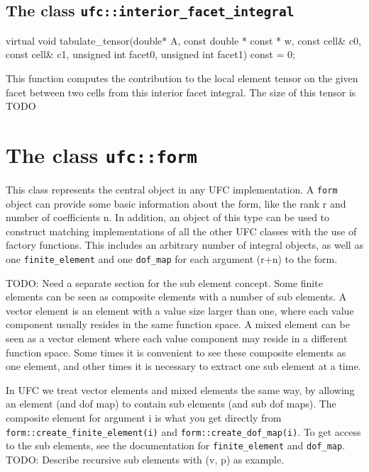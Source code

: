 
\subsection{The class \texttt{ufc::interior\_facet\_integral}}
\begin{code}
virtual void tabulate_tensor(double* A,
                             const double * const * w,
                             const cell& c0,
                             const cell& c1,
                             unsigned int facet0,
                             unsigned int facet1) const = 0;
\end{code}
This function computes the contribution to the local element tensor
on the given facet between two cells from this interior facet integral.
The size of this tensor is TODO


\section{The class \texttt{ufc::form}}

This class represents the central object in any UFC implementation.
A \texttt{form} object can provide some basic information about the form,
like the rank r and number of coefficients n.
In addition, an object of this type can be used to construct matching
implementations of all the other UFC classes with the use of factory functions.
This includes an arbitrary number of integral objects,
as well as one \texttt{finite\_element} and one \texttt{dof\_map} for
each argument (r+n) to the form.

TODO: Need a separate section for the sub element concept.
Some finite elements can be seen as composite elements with a number of sub elements.
A vector element is an element with a value size larger than one,
where each value component usually resides in the same function space.
A mixed element can be seen as a vector element where each value
component may reside in a different function space.
Some times it is convenient to see these composite elements as one element,
and other times it is necessary to extract one sub element at a time.

In UFC we treat vector elements and mixed elements the same way, by allowing
an element (and dof map) to contain sub elements (and sub dof maps).
The composite element for argument i is what you get directly from
\texttt{form::create\_finite\_element(i)} and \texttt{form::create\_dof\_map(i)}.
To get access to the sub elements, see the documentation for
\texttt{finite\_element} and \texttt{dof\_map}.
TODO: Describe recursive sub elements with (v, p) as example.

